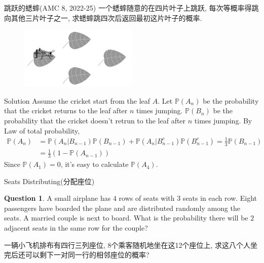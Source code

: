\documentclass{beamer}
\theoremstyle{definition}
\newtheorem{ques}[defn]{Question}
\newcommand{\bb}[1]{\mathbb{#1}}
\begin{document}
\begin{frame}{跳跃的蟋蟀(AMC 8, 2022-25)}
    一个蟋蟀随意的在四片叶子上跳跃, 每次等概率得跳向其他三片叶子之一, 求蟋蟀跳四次后返回最初这片叶子的概率.
    \begin{figure}
        \centering
        \includegraphics[width=0.5\textwidth]{AMC8-2022-25.jpg}
    \end{figure}
\end{frame}
\begin{frame}{Solution}
    Assume the cricket start from the leaf $A$.
    Let $\bb{P}(A_n)$ be the probability that the cricket returns to the leaf after $n$ times jumping. $\bb{P}(B_n)$ be the
    probability that the cricket doesn't retrun to the leaf after $n$ times jumping.
    By Law of total probability,
    \begin{align*}
        \bb{P}(A_n) & =\bb{P}(A_n|B_{n-1})\bb{P}(B_{n-1})+\bb{P}(A_n|B_{n-1}^c)\bb{P}(B_{n-1}^c)=\frac{1}{3}\bb{P}(B_{n-1}) \\
                    & =\frac{1}{3}(1-\bb{P}(A_{n-1}))
    \end{align*}
    Since $ \bb{P}(A_1)=0$, it's easy to calculate $\bb{P}(A_4)$.

\end{frame}
\begin{frame}{Seats Distributing(分配座位)}
    \begin{ques}
        A small airplane has $4$ rows of seats with $3$ seats in each row.
        Eight passengers have boarded the plane and are distributed randomly among the seats. A married couple is next to board. What is the probability there will be $2$ adjacent seats in the same row for the couple?

        一辆小飞机排布有四行三列座位, 8个乘客随机地坐在这12个座位上, 求这八个人坐完后还可以剩下一对同一行的相邻座位的概率?
    \end{ques}
\end{frame}
\end{document}
